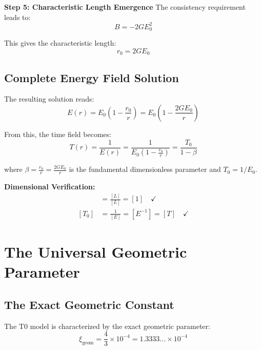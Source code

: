 \documentclass[12pt,a4paper]{report}
\newcommand{\rzero}{r_0}                  %
\newcommand{\xigeom}{\xi_{\text{geom}}}   %
\begin{document}
	\textbf{Step 5: Characteristic Length Emergence}
	The consistency requirement leads to:
	\begin{equation}
		B = -2GE_0^2
	\end{equation}
	
	This gives the characteristic length:
	\begin{equation}
		\boxed{\rzero = 2GE_0}
	\end{equation}
	
	\subsection{Complete Energy Field Solution}\label{subsec:complete_solution}
	
	The resulting solution reads:
	\begin{equation}
		\boxed{E(r) = E_0\left(1 - \frac{\rzero}{r}\right) = E_0\left(1 - \frac{2GE_0}{r}\right)}
		\label{eq:complete_energy_solution}
	\end{equation}
	
	From this, the time field becomes:
	\begin{equation}
		T(r) = \frac{1}{E(r)} = \frac{1}{E_0\left(1 - \frac{\rzero}{r}\right)} = \frac{T_0}{1 - \beta}
		\label{eq:time_field_solution}
	\end{equation}
	
	where $\beta = \frac{\rzero}{r} = \frac{2GE_0}{r}$ is the fundamental dimensionless parameter and $T_0 = 1/E_0$.
	
	\textbf{Dimensional Verification:}
	\begin{align}
		[\beta] &= \frac{[L]}{[L]} = [1] \quad \checkmark \\
		[T_0] &= \frac{1}{[E]} = [E^{-1}] = [T] \quad \checkmark
	\end{align}
	
	\section{The Universal Geometric Parameter}\label{sec:universal_geometric_parameter}
	
	\subsection{The Exact Geometric Constant}\label{subsec:exact_geometric_constant}
	
	The T0 model is characterized by the exact geometric parameter:
	\begin{equation}
		\boxed{\xigeom = \frac{4}{3} \times 10^{-4} = 1.3333... \times 10^{-4}}
		\label{eq:geometric_parameter}
	\end{equation}
	
\end{document}
